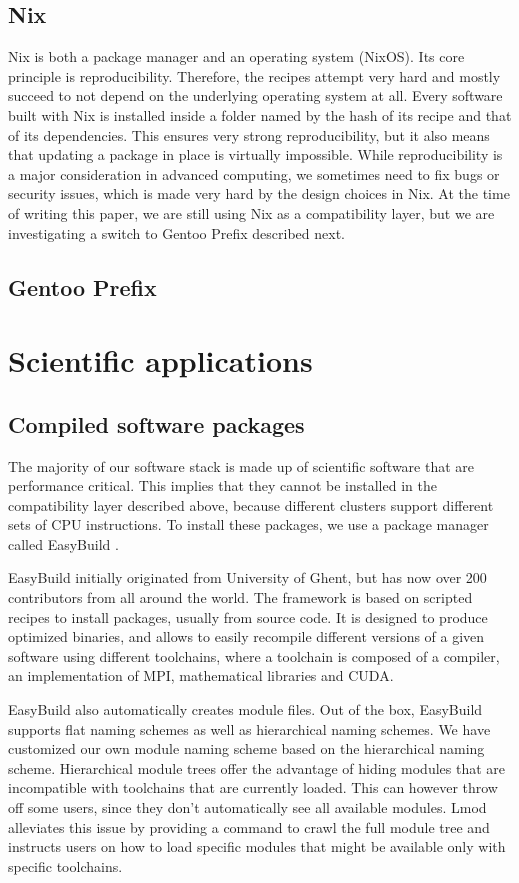 \documentclass[sigconf]{acmart}
\begin{document}
\subsection{Nix}
Nix \cite{Nix} is both a package manager and an operating system (NixOS). Its core principle is reproducibility.
Therefore, the recipes attempt very hard and mostly succeed to not depend on the underlying operating system at all.
Every software built with Nix is installed inside a folder named by the hash of its recipe and that of its
dependencies. This ensures very strong reproducibility, but it also means that updating a package in place is virtually
impossible. While reproducibility is a major consideration in advanced computing, we sometimes need to fix bugs or
security issues, which is made very hard by the design choices in Nix. At the time of writing this paper, we are still
using Nix as a compatibility layer, but we are investigating a switch to Gentoo Prefix described next.

\subsection{Gentoo Prefix}

\section{Scientific applications}

\subsection{Compiled software packages}
The majority of our software stack is made up of scientific software that are performance critical. This implies that
they cannot be installed in the compatibility layer described above, because different clusters support different sets
of CPU instructions. To install these packages, we use a package manager called EasyBuild
\cite{EasyBuild2012,EasyBuild2014,EasyBuild2016}.

EasyBuild initially originated from University of Ghent, but has now over 200 contributors from all around the world.
The framework is based on scripted recipes to install packages, usually from source code. It is designed to produce
optimized binaries, and allows to easily recompile different versions of a given software using different toolchains,
where a toolchain is composed of a compiler, an implementation of MPI, mathematical libraries and CUDA.

EasyBuild also automatically creates module files. Out of the box, EasyBuild supports flat naming schemes as well as
hierarchical naming schemes. We have customized our own module naming scheme based on the hierarchical naming scheme.
Hierarchical module trees offer the advantage of hiding modules that are incompatible with toolchains that are
currently loaded. This can however throw off some users, since they don’t automatically see all available modules. Lmod
\cite{Lmod} alleviates this issue by providing a command to crawl the full module tree and instructs users on how to
load specific modules that might be available only with specific toolchains.
\end{document}
